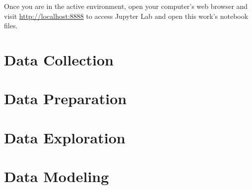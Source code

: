 Once you are in the active environment, open your computer's web browser and visit \url{http://localhost:8888} to access Jupyter Lab and open this work's notebook files.

\section{Data Collection}

\section{Data Preparation}

\section{Data Exploration}

\section{Data Modeling}


